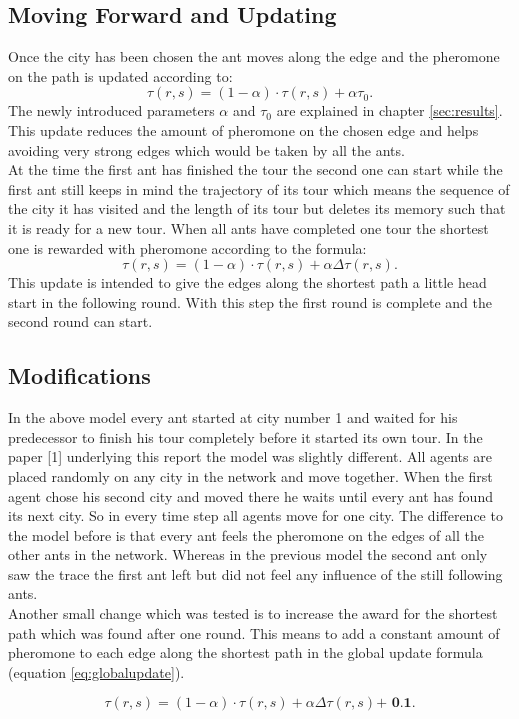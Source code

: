 \subsection{Moving Forward and Updating}
Once the city has been chosen the ant moves along the edge and the pheromone on the path is updated according to:
\begin{equation}
\tau (r,s) = (1-\alpha)\cdot \tau(r,s) + \alpha \tau_0.
\label{eq:loctauupdate}
\end{equation}
The newly introduced parameters $\alpha$ and $\tau_0$ are explained in chapter \ref{sec:results}. This update reduces the amount of pheromone on the chosen edge and helps avoiding very strong edges which would be taken by all the ants. \\
At the time the first ant has finished the tour the second one can start while the first ant still keeps in mind the trajectory of its tour which means the sequence of the city it has visited and the length of its tour but deletes its memory such that it is ready for a new tour. When all ants have completed one tour the shortest one is rewarded with pheromone according to the formula:
\begin{equation}
\tau(r,s) = (1-\alpha)\cdot \tau(r,s) + \alpha \Delta \tau(r,s).
\label{eq:globalupdate}
\end{equation}
This update is intended to give the edges along the shortest path a little head start in the following round. With this step the first round is complete and the second round can start.

\subsection{Modifications}

In the above model every ant started at city number 1 and waited for his predecessor to finish his tour completely before it started its own tour. In the paper [1] underlying this report the model was slightly different. All agents are placed randomly on any city in the network and move together. When the first agent chose his second city and moved there he waits until every ant has found its next city. So in every time step all agents move for one city. The difference to the model before is that every ant feels the pheromone on the edges of all the other ants in the network. Whereas in the previous model the second ant only saw the trace the first ant left but did not feel any influence of the still following ants. \\
Another small change which was tested is to increase the award for the shortest path which was found after one round. This means to add a constant amount of pheromone to each edge along the shortest path in the global update formula (equation \ref{eq:globalupdate}).

\begin{equation}
\tau(r,s) = (1-\alpha)\cdot \tau(r,s) + \alpha \Delta \tau(r,s) \textbf{+ 0.1}.
\label{eq:globalupdate2}
\end{equation}